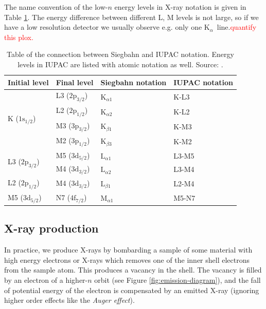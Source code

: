 \documentclass[11pt,a4paper,twoside,onecolumn]{article}
\newcommand{\reminder}[1]{\textcolor{red}{#1}}
\newcommand{\Kalpha}{$\mathrm{K}_\alpha$~}
\begin{document}
The name convention of the low-$n$ energy levels in X-ray notation is given in Table \ref{tab:siegbahn-notation}. The energy difference between different L, M levels is not large, so if we have a low resolution detector we usually observe e.g. only one \Kalpha line.\reminder{quantify this plox.}
\begin{table}[!htbp]
    \centering
    \begin{tabular}{@{}llll@{}}
    \toprule
    \multicolumn{1}{c}{Initial level} & \multicolumn{1}{c}{Final level} & \multicolumn{1}{c}{Siegbahn notation} & \multicolumn{1}{c}{IUPAC notation} \\ \midrule
    \multirow{4}{*}{K ($1\mathrm{s}_{1/2}$)}  & L3 ($2\mathrm{p}_{3/2}$) & $\mathrm{K}_{\alpha 1}$ & K-L3  \\
                                              & L2 ($2\mathrm{p}_{1/2}$) & $\mathrm{K}_{\alpha 2}$ & K-L2  \\
                                              & M3 ($3\mathrm{p}_{3/2}$) & $\mathrm{K}_{\beta 1}$  & K-M3  \\
                                              & M2 ($3\mathrm{p}_{1/2}$) & $\mathrm{K}_{\beta 3}$  & K-M2  \\
    \multirow{2}{*}{L3 ($2\mathrm{p}_{3/2}$)} & M5 ($3\mathrm{d}_{5/2}$) & $\mathrm{L}_{\alpha 1}$ & L3-M5 \\
                                              & M4 ($3\mathrm{d}_{3/2}$) & $\mathrm{L}_{\alpha 2}$ & L3-M4 \\
    L2 ($2\mathrm{p}_{1/2}$)                  & M4 ($3\mathrm{d}_{3/2}$) & $\mathrm{L}_{\beta 1}$  & L2-M4 \\
    M5 ($3\mathrm{d}_{5/2}$)                  & N7 ($4\mathrm{f}_{7/2}$) & $\mathrm{M}_{\alpha 1}$ & M5-N7 \\ \bottomrule
    \end{tabular}
    \caption{Table of the connection between Siegbahn and IUPAC notation. Energy levels in IUPAC are listed with atomic notation as well. Source: \cite{Jenkins1991}.}
    \label{tab:siegbahn-notation}
\end{table}

\subsection{X-ray production}\label{subsec:x-ray-production}
In practice, we produce X-rays by bombarding a sample of some material with high energy electrons or X-rays which removes one of the inner shell electrons from the sample atom. This produces a vacancy in the shell. The vacancy is filled by an electron of a higher-$n$ orbit (see Figure \ref{fig:emission-diagram}), and the fall of potential energy of the electron is compensated by an emitted X-ray (ignoring higher order effects like the \emph{Auger effect}).
\end{document}
